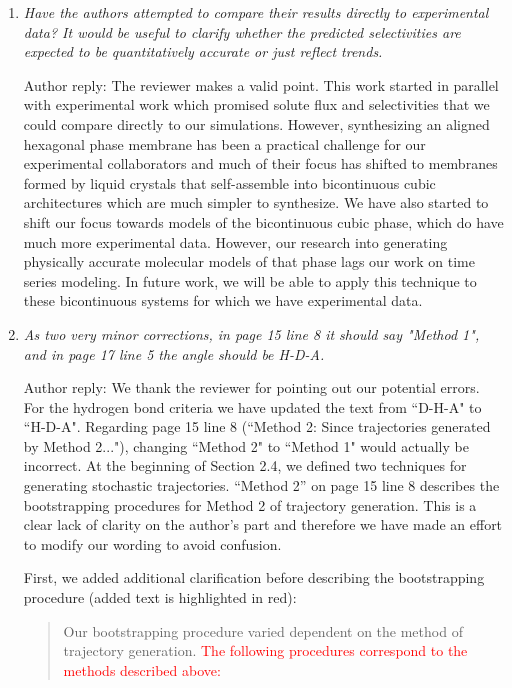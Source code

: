 \documentclass{article}
\begin{document}
\begin{enumerate}[label={Comment \theenumi :}, leftmargin=3.9\parindent]
    \item \textit{Have the authors attempted to compare their results directly to experimental data? 
    It would be useful to clarify whether the predicted selectivities are expected to be quantitatively
    accurate or just reflect trends.}
		 
    Author reply: The reviewer makes a valid point. This work started in parallel with experimental
    work which promised solute flux and selectivities that we could compare directly to our
	simulations. However, synthesizing an aligned hexagonal phase membrane has been a practical
	challenge for our experimental collaborators and much of their focus has shifted to 
	membranes formed by liquid crystals that self-assemble into bicontinuous cubic architectures
	which are much simpler to synthesize. We have also started to shift our focus towards models 
	of the bicontinuous cubic phase, which do have much more experimental data. However, our 
	research into generating physically accurate molecular models of that phase lags our work on
	time series modeling. In future work, we will be able to apply this technique to these 
	bicontinuous systems for which we have experimental data.

    \item \textit{As two very minor corrections, in page 15 line 8 it should say "Method 1", and in 
    page 17 line 5 the angle should be H-D-A.}
    
    Author reply: We thank the reviewer for pointing out our potential errors. For the hydrogen bond
    criteria we have updated the text from ``D-H-A" to ``H-D-A". Regarding page 15 line 8 (``Method 2:
    Since trajectories generated by Method 2..."), changing ``Method 2" to ``Method 1" would actually be 
    incorrect. At the beginning of Section 2.4, we defined two techniques for generating stochastic 
    trajectories. ``Method 2'' on page 15 line 8 describes the bootstrapping procedures for Method 2 of
    trajectory generation. This is a clear lack of clarity on the author's part and therefore we 
    have made an effort to modify our wording to avoid confusion.
    
    First, we added additional clarification before describing the bootstrapping procedure (added text
    is highlighted in red):
    \begin{quote}
    Our bootstrapping procedure varied dependent on the method of trajectory generation. \textcolor{red}{
    The following procedures correspond to the methods described above:}
    \end{quote}
    

\end{enumerate}
\end{document}
